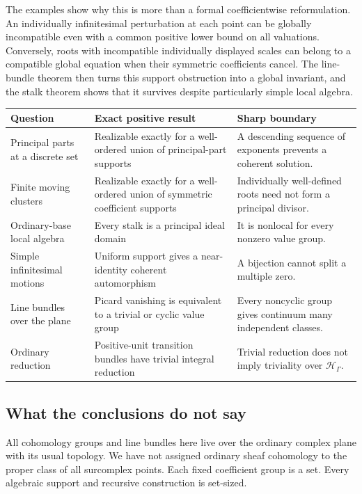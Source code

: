 \documentclass[11pt,letterpaper]{article}
\theoremstyle{definition}
\theoremstyle{remark}
\newcommand{\HH}{\mathscr H_\Gamma}
\numberwithin{equation}{section}
\begin{document}
The examples show why this is more than a formal coefficientwise reformulation. An individually infinitesimal perturbation at each point can be globally incompatible even with a common positive lower bound on all valuations. Conversely, roots with incompatible individually displayed scales can belong to a compatible global equation when their symmetric coefficients cancel. The line-bundle theorem then turns this support obstruction into a global invariant, and the stalk theorem shows that it survives despite particularly simple local algebra.

\begin{center}\small
\begin{tabular}{@{}L{0.26\textwidth}L{0.32\textwidth}L{0.32\textwidth}@{}}
\toprule
Question & Exact positive result & Sharp boundary\\
\midrule
Principal parts at a discrete set & Realizable exactly for a well-ordered union of principal-part supports & A descending sequence of exponents prevents a coherent solution.\\[0.45em]
Finite moving clusters & Realizable exactly for a well-ordered union of symmetric coefficient supports & Individually well-defined roots need not form a principal divisor.\\[0.45em]
Ordinary-base local algebra & Every stalk is a principal ideal domain & It is nonlocal for every nonzero value group.\\[0.45em]
Simple infinitesimal motions & Uniform support gives a near-identity coherent automorphism & A bijection cannot split a multiple zero.\\[0.45em]
Line bundles over the plane & Picard vanishing is equivalent to a trivial or cyclic value group & Every noncyclic group gives continuum many independent classes.\\[0.45em]
Ordinary reduction & Positive-unit transition bundles have trivial integral reduction & Trivial reduction does not imply triviality over $\HH$.\\
\bottomrule
\end{tabular}
\end{center}

\subsection{What the conclusions do not say}
All cohomology groups and line bundles here live over the ordinary complex plane with its usual topology. We have not assigned ordinary sheaf cohomology to the proper class of all surcomplex points. Each fixed coefficient group is a set. Every algebraic support and recursive construction is set-sized.
\end{document}
